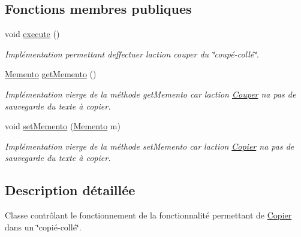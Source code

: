 \subsection*{Fonctions membres publiques}
\begin{DoxyCompactItemize}
\item 
void \hyperlink{classfr_1_1istic_1_1m1_1_1aco_1_1miniediteur_1_1v1_1_1Couper_aa646ea059793eb7db2066175369cbdae}{execute} ()
\begin{DoxyCompactList}\small\item\em Implémentation permettant d\textquotesingle{}effectuer l\textquotesingle{}action couper du \char`\"{}coupé-\/collé\char`\"{}. \end{DoxyCompactList}\item 
\hyperlink{interfacefr_1_1istic_1_1m1_1_1aco_1_1miniediteur_1_1v1_1_1Memento}{Memento} \hyperlink{classfr_1_1istic_1_1m1_1_1aco_1_1miniediteur_1_1v1_1_1Couper_aa4f63cd2eb49ae3b96f175989d93c338}{get\+Memento} ()
\begin{DoxyCompactList}\small\item\em Implémentation vierge de la méthode get\+Memento car l\textquotesingle{}action \hyperlink{classfr_1_1istic_1_1m1_1_1aco_1_1miniediteur_1_1v1_1_1Couper}{Couper} n\textquotesingle{}a pas de sauvegarde du texte à copier. \end{DoxyCompactList}\item 
\mbox{\label{classfr_1_1istic_1_1m1_1_1aco_1_1miniediteur_1_1v1_1_1Couper_a36f0578188f4526c624565c9afa4abc8}} 
void \hyperlink{classfr_1_1istic_1_1m1_1_1aco_1_1miniediteur_1_1v1_1_1Couper_a36f0578188f4526c624565c9afa4abc8}{set\+Memento} (\hyperlink{interfacefr_1_1istic_1_1m1_1_1aco_1_1miniediteur_1_1v1_1_1Memento}{Memento} m)
\begin{DoxyCompactList}\small\item\em Implémentation vierge de la méthode set\+Memento car l\textquotesingle{}action \hyperlink{classfr_1_1istic_1_1m1_1_1aco_1_1miniediteur_1_1v1_1_1Copier}{Copier} n\textquotesingle{}a pas de sauvegarde du texte à copier. \end{DoxyCompactList}\end{DoxyCompactItemize}


\subsection{Description détaillée}
Classe contrôlant le fonctionnement de la fonctionnalité permettant de \hyperlink{classfr_1_1istic_1_1m1_1_1aco_1_1miniediteur_1_1v1_1_1Copier}{Copier} dans un \char`\"{}copié-\/collé\char`\"{}. 

